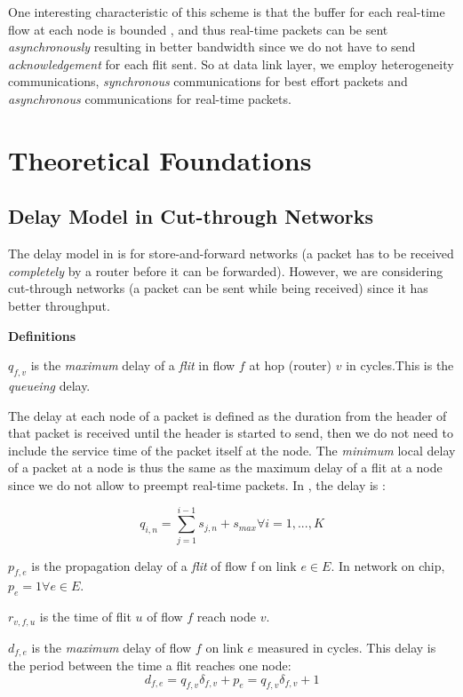 \documentclass[10pt]{article}
\begin{document}
One interesting characteristic of this scheme is that the buffer for each 
real-time flow at each node is bounded \cite{Ferrari90ascheme}, and thus
real-time packets can be sent {\em asynchronously} resulting in better bandwidth
since we do not have to send {\em acknowledgement} for each flit sent. So at
data link layer, we employ heterogeneity communications, {\em synchronous}
communications for best effort packets and {\em asynchronous} communications
for real-time packets.

\section{Theoretical Foundations}
\subsection{Delay Model in Cut-through Networks}

The delay model in \cite{Ferrari90ascheme, VermaJitter91} is
for store-and-forward networks \cite{DallyPrinNetwork} (a packet has to be
received {\em completely} by a router before it can be forwarded). However, we
are considering cut-through networks (a packet can be sent while being
received) since it has better throughput.

{\textbf{Definitions}}

$q_{f,v}$ is the {\em maximum} delay of a {\em flit} in flow $f$ at
hop (router) $v$ in cycles.This is the {\em queueing} delay.

The delay at each node of a packet is defined as the duration from the header
of that  packet is received until the header is started to send, then we do not need to include
the service time of the packet itself at the node. The {\em minimum} local
delay of a packet at a node is thus the same as the maximum delay of a flit
at a node since we do not allow to preempt real-time packets. In
\cite{Ferrari90ascheme}, the delay is :

\begin{equation}\label{equ:nodedelay1}
q_{i,n} = \sum_{j=1}^{i-1}s_{j,n}+s_{max} \forall i = 1, ..., K
\end{equation}

 
$p_{f,e}$ is the propagation delay of a {\em flit} of flow f on link $e
\in E$. In network on chip, $p_e=1 \forall e \in E$.

$r_{v,f,u}$ is the time of flit $u$ of flow $f$ reach node $v$.  

$d_{f,e}$ is the {\em maximum} delay of flow $f$ on link $e$ measured in
cycles. This delay is the period between the time a flit reaches one node:
\begin{equation}\label{equ:edgeDelay}
d_{f,e} = q_{f,v}\delta_{f,v} + p_{e} = q_{f,v}\delta_{f,v} + 1 
\end{equation}
\end{document}
